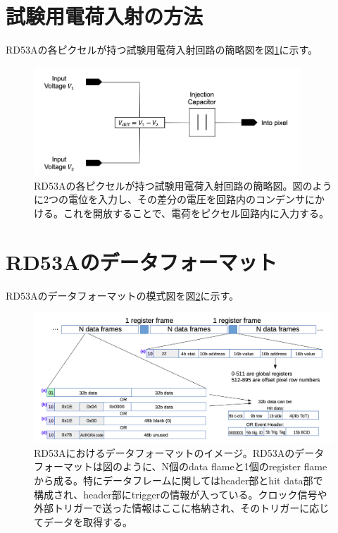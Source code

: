 \section{試験用電荷入射の方法}
RD53Aの各ピクセルが持つ試験用電荷入射回路の簡略図を図\ref{injection_circuit}に示す。
\begin{figure}[bpt]\centering
\includegraphics[width=10cm]{./injection_circuit.png}
\caption[RD53Aの各ピクセルが持つ試験用電荷入射回路の簡略図]{RD53Aの各ピクセルが持つ試験用電荷入射回路の簡略図\cite{b-1}。図のように2つの電位を入力し、その差分の電圧を回路内のコンデンサにかける。これを開放することで、電荷をピクセル回路内に入力する。}
\label{injection_circuit}
\end{figure}

\section{RD53Aのデータフォーマット}
RD53Aのデータフォーマットの模式図を図\ref{RD53A_data_format}に示す。
\begin{figure}[bpt]\centering
\includegraphics[width=14cm]{./RD53A_data_format.png}
\caption[RD53Aにおけるデータフォーマットのイメージ図]{RD53Aにおけるデータフォーマットのイメージ\cite{2-1}。RD53Aのデータフォーマットは図のように、N個のdata flameと1個のregister flameから成る。特にデータフレームに関してはheader部とhit data部で構成され、header部にtriggerの情報が入っている。クロック信号や外部トリガーで送った情報はここに格納され、そのトリガーに応じてデータを取得する。}
\label{RD53A_data_format}
\end{figure}


